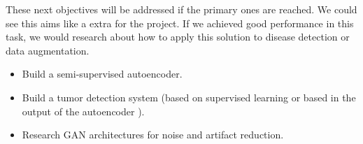 These next objectives will be addressed if the primary ones are reached. We could see this aims like a extra for the project. If we achieved good performance in this task, we would research about how to apply this solution to disease detection or data augmentation.

\begin{itemize}
    \item Build a semi-supervised autoencoder.
    \item Build a tumor detection system (based on supervised learning or based in the output of the autoencoder \cite{pinaya2019}).
    \item Research GAN architectures for noise and artifact reduction.
\end{itemize}
